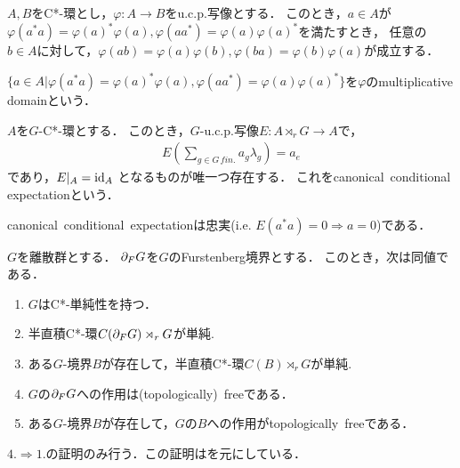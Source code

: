 \documentclass{jsarticle}[12pt]
\begin{document}
\begin{theorem}
  $A, B$をC*-環とし，$\varphi: A \rightarrow B$をu.c.p.写像とする．
  このとき，$a \in A$が$\varphi(a^*a) = \varphi(a)^*\varphi(a), \varphi(aa^*) = \varphi(a)\varphi(a)^*$を満たすとき，
  任意の$b \in A$に対して，$\varphi(ab) = \varphi(a)\varphi(b), \varphi(ba) = \varphi(b)\varphi(a)$が成立する．
\end{theorem}
\begin{definition}
  $\{a \in A|\varphi(a^*a) = \varphi(a)^*\varphi(a), \varphi(aa^*) = \varphi(a)\varphi(a)^*\}$を$\varphi$のmultiplicative\, domainという．
\end{definition}
\begin{definition}
  $A$を$G$-C*-環とする．
  このとき，$G$-u.c.p.写像$E : A \rtimes_r G \rightarrow A$で，
  \begin{align*}
    E(\sum_{g \in G\, fin.}a_g \lambda_g) = a_e
  \end{align*}
  であり，$E|_A = {\rm id}_A$
  となるものが唯一つ存在する．
  これをcanonical\, conditional\, expectationという．
\end{definition}
\begin{remark}
  canonical\, conditional\, expectationは忠実(i.e. $E(a^*a) = 0 \Rightarrow a = 0$)である．
\end{remark}
\begin{theorem}
  $G$を離散群とする．
  $\frak{\partial}_F G$を$G$のFurstenberg境界とする．
  このとき，次は同値である．
  \begin{enumerate}
  \item $G$はC*-単純性を持つ．
  \item 半直積C*-環$C(\frak{\partial}_F G) \rtimes_r G$が単純.
  \item ある$G$-境界$B$が存在して，半直積C*-環$C(B) \rtimes_r G$が単純.
  \item $G$の$\frak{\partial}_F G$への作用は(topologically)\, freeである．
  \item ある$G$-境界$B$が存在して，$G$の$B$への作用がtopologically\, freeである．
  \end{enumerate}
\end{theorem}
$4. \Rightarrow 1.$の証明のみ行う．この証明は\cite{breuillard2017c}を元にしている．
\end{document}
